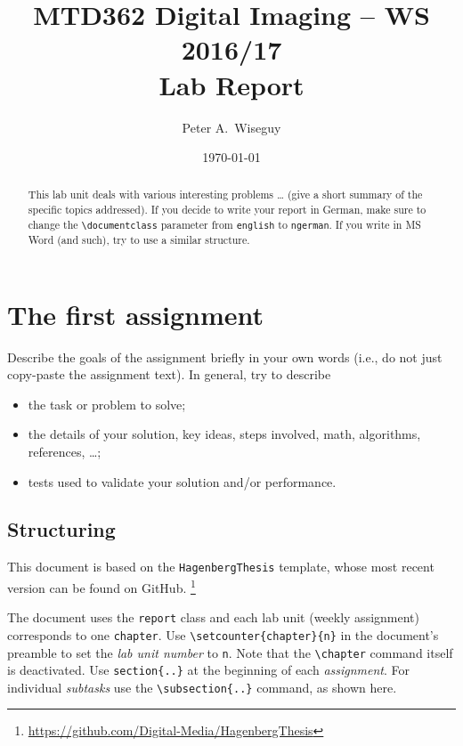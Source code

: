 \documentclass[a4paper,onecolumn,notitlepage,english,11pt]{report}
\author{Peter A.\ Wiseguy}
\title{MTD362 Digital Imaging -- WS 2016/17\\
				Lab Report \arabic{chapter}}
\date{\today}
\renewcommand{\chapter}[1]{}	%
\begin{document}
\maketitle

\begin{abstract}\noindent
This lab unit deals with various interesting problems  \ldots 
(give a short summary of the specific topics addressed).
If you decide to write your report in German, make sure to
change the \verb!\documentclass! parameter from \texttt{english}
to \texttt{ngerman}.
If you write in MS Word (and such), try to use a similar structure.
\end{abstract}



\section{The first assignment}

Describe the goals of the assignment briefly in your own words
(i.e., do not just copy-paste the assignment text).
In general, try to describe
\begin{itemize}
\item
	the task or problem to solve;
\item
	the details of your solution, key ideas, steps involved, math, algorithms,
	references, \ldots ;
\item
	tests used to validate your solution and/or performance.
\end{itemize}

\subsection{Structuring}	%

This \latex document is based on the \texttt{HagenbergThesis} 
template, whose most recent version can be found on GitHub.%
\footnote{\url{https://github.com/Digital-Media/HagenbergThesis}}

The document uses the \texttt{report} class and each lab unit 
(weekly assignment) corresponds to one \texttt{chapter}.
Use \verb!\setcounter{chapter}{n}! in the document's preamble
to set the \emph{lab unit number} to \texttt{n}.
Note that the \verb!\chapter! command itself is deactivated.
Use \verb!section{..}! at the beginning of each \emph{assignment}.
For individual \emph{subtasks} use the 
\verb!\subsection{..}! command, as shown here.
\end{document}
